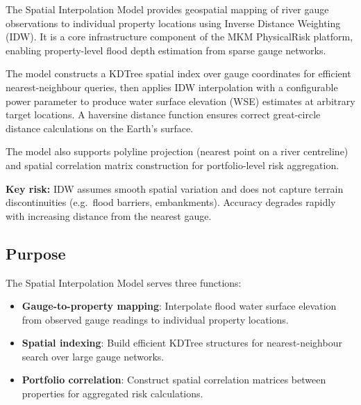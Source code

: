 \documentclass[11pt,a4paper]{article}
\begin{document}
\mkmtitlepage
\mkmlegalpage
\tableofcontents
\clearpage

\mkmexecsummary

The Spatial Interpolation Model provides geospatial mapping of river gauge
observations to individual property locations using Inverse Distance Weighting
(IDW). It is a core infrastructure component of the MKM PhysicalRisk platform,
enabling property-level flood depth estimation from sparse gauge networks.

The model constructs a KDTree spatial index over gauge coordinates for efficient
nearest-neighbour queries, then applies IDW interpolation with a configurable
power parameter to produce water surface elevation (WSE) estimates at arbitrary
target locations. A haversine distance function ensures correct great-circle
distance calculations on the Earth's surface.

The model also supports polyline projection (nearest point on a river centreline)
and spatial correlation matrix construction for portfolio-level risk aggregation.

\textbf{Key risk:} IDW assumes smooth spatial variation and does not capture
terrain discontinuities (e.g.\ flood barriers, embankments). Accuracy degrades
rapidly with increasing distance from the nearest gauge.


\mkmpurpose

\subsection{Purpose}

The Spatial Interpolation Model serves three functions:

\begin{itemize}[nosep]
    \item \textbf{Gauge-to-property mapping}: Interpolate flood water surface
          elevation from observed gauge readings to individual property locations.
    \item \textbf{Spatial indexing}: Build efficient KDTree structures for
          nearest-neighbour search over large gauge networks.
    \item \textbf{Portfolio correlation}: Construct spatial correlation matrices
          between properties for aggregated risk calculations.
\end{itemize}
\end{document}
